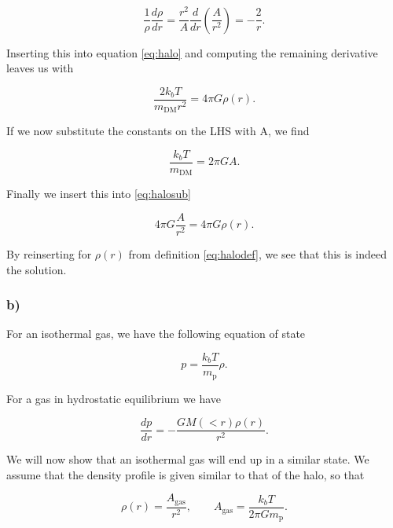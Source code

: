 \documentclass[a4paper]{article}
\begin{document}
\begin{equation*}
    \frac{1}{\rho} \frac{d \rho}{dr} = \frac{r^2}{A} \frac{d}{dr} \left( \frac{A}{r^2}
    \right) = -\frac{2}{r}. 
\end{equation*}

\noindent Inserting this into equation \eqref{eq:halo} and computing the remaining
derivative
leaves us with

\begin{equation}\label{eq:halosub}
    \frac{2k_b T}{m_{\text{DM}}r^2} = 4\pi G \rho(r).
\end{equation}

\noindent If we now substitute the constants on the LHS with A, we find

\begin{equation*}
    \frac{k_b T}{m_\text{DM}} = 2\pi G A.
\end{equation*}

\noindent Finally we insert this into \eqref{eq:halosub}

\begin{equation*}
    4\pi G \frac{A}{r^2} = 4\pi G \rho(r).
\end{equation*}

\noindent By reinserting for $\rho(r)$ from definition \eqref{eq:halodef}, we see that
this is
indeed the solution.

\subsubsection*{b)}

For an isothermal gas, we have the following equation of state

\begin{equation}\label{eq:isoEOS}
    p = \frac{k_b T}{m_\text{p}} \rho.
\end{equation}

\noindent For a gas in hydrostatic equilibrium we have

\begin{equation}\label{eq:hydrostatic}
    \frac{dp}{dr} = - \frac{GM(<r)\rho(r)}{r^2}.
\end{equation}

\noindent We will now show that an isothermal gas will end up in a similar state. We assume that the density profile is given similar to that of the halo, so that 

\begin{equation*}
    \rho (r) = \frac{A_\text{gas}}{r^2}, \qquad  A_\text{gas}  = \frac{k_b T}{2\pi G
    m_\text{p}}.
\end{equation*}
\end{document}
